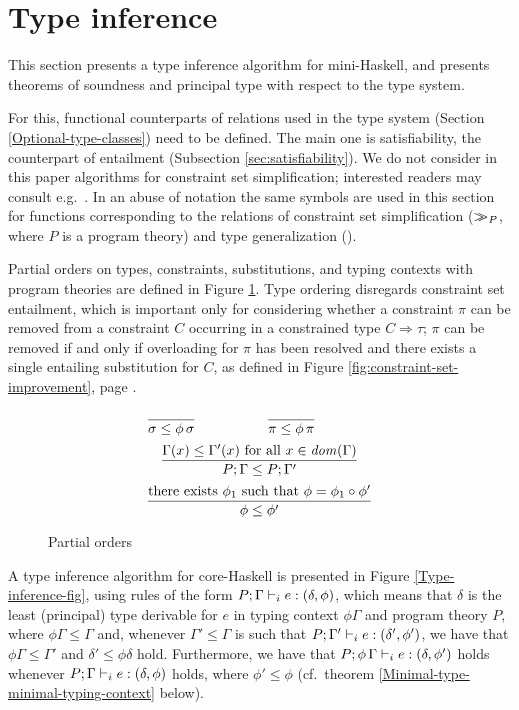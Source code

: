 \section{Type inference}
\label{sec:type-inference}

This section presents a type inference algorithm for mini-Haskell, and
presents theorems of soundness and principal type with respect to the
type system.

For this, functional counterparts of relations used in the type system
(Section \ref{Optional-type-classes}) need to be defined. The main one
is satisfiability, the counterpart of entailment (Subsection
\ref{sec:satisfiability}).  We do not consider in this paper
algorithms for constraint set simplification; interested readers may
consult e.g.~\cite{OutsideIn2011}. In an abuse of notation the same
symbols are used in this section for functions corresponding to the
relations of constraint set simplification ($>\!\!\!>_{P}$, where
$P$ is a program theory) and type generalization (\gen).

Partial orders on types, constraints, substitutions, and typing
contexts with program theories are defined in Figure \ref{Order}.
Type ordering disregards constraint set entailment, which is important
only for considering whether a constraint $\pi$ can be removed from a
constraint $C$ occurring in a constrained type $C \Rightarrow \tau$;
$\pi$ can be removed if and only if overloading for $\pi$ has been
resolved and there exists a single entailing substitution for $C$, as
defined in Figure \ref{fig:constraint-set-improvement}, page
\pageref{fig:constraint-set-improvement}.

\begin{figure}
   \[ \begin{array}{cc}
   	\displaystyle\frac
          {}
          {\sigma \leq \phi\,\sigma}
   	  & 
   	\displaystyle\frac
   	  {}
   	  {\pi \leq \phi\,\pi} \\[.4cm]
        \multicolumn{2}{c}{
          \displaystyle\frac
	    {\Gamma(x) \leq \Gamma'(x) \text{ for all } x\in \dom{\Gamma}}
	    {P;\Gamma \leq P;\Gamma'}}\\[.4cm]
        \multicolumn{2}{c}{
          \displaystyle\frac
          {\text{there exists $\phi_1$ such that $\phi = \phi_1 \circ \phi'$}}
          {\phi\leq \phi'}}
  \end{array} \]
\caption{Partial orders}
\label{Order}
\end{figure}

A type inference algorithm for core-Haskell is presented in Figure
\ref{Type-inference-fig}, using rules of the form $P;\Gamma \vdash_i
e:(\delta,\phi)$, which means that $\delta$ is the least (principal)
type derivable for $e$ in typing context $\phi\Gamma$ and program
theory $P$, where $\phi\Gamma \leq \Gamma$ and, whenever $\Gamma' \leq
\Gamma$ is such that $P;\Gamma' \vdash_i e: (\delta',\phi')$, we have that
$\phi\Gamma \leq \Gamma'$ and $\delta' \leq \phi\delta$
hold. Furthermore, we have that $P;\phi\,\Gamma \vdash_i e:(\delta,\phi')$
holds whenever $P;\Gamma \vdash_i e:(\delta,\phi)$ holds, where $\phi'\leq
\phi$ (cf.~theorem \ref{Minimal-type-minimal-typing-context} below).

